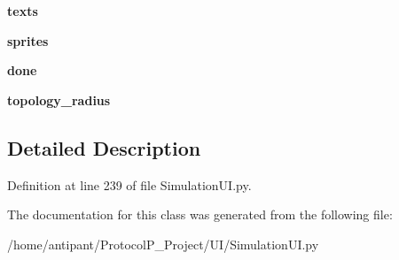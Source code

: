 \begin{DoxyCompactItemize}
\item 
\hypertarget{classSimulationUI_1_1SimulationUI_a70b871721636d65e7962a605990d08a5}{{\bfseries texts}}\label{classSimulationUI_1_1SimulationUI_a70b871721636d65e7962a605990d08a5}

\item 
\hypertarget{classSimulationUI_1_1SimulationUI_ad92de075a60670b0fbeb5e8b8105caf1}{{\bfseries sprites}}\label{classSimulationUI_1_1SimulationUI_ad92de075a60670b0fbeb5e8b8105caf1}

\item 
\hypertarget{classSimulationUI_1_1SimulationUI_a226a676b0d98ed3394e4f6e7cbccfe6a}{{\bfseries done}}\label{classSimulationUI_1_1SimulationUI_a226a676b0d98ed3394e4f6e7cbccfe6a}

\item 
\hypertarget{classSimulationUI_1_1SimulationUI_a197179ca90f7ebddbcbee2c1e06bcec5}{{\bfseries topology\-\_\-radius}}\label{classSimulationUI_1_1SimulationUI_a197179ca90f7ebddbcbee2c1e06bcec5}

\end{DoxyCompactItemize}


\subsection{Detailed Description}


Definition at line 239 of file Simulation\-U\-I.\-py.



The documentation for this class was generated from the following file\-:\begin{DoxyCompactItemize}
\item 
/home/antipant/\-Protocol\-P\-\_\-\-Project/\-U\-I/Simulation\-U\-I.\-py\end{DoxyCompactItemize}
